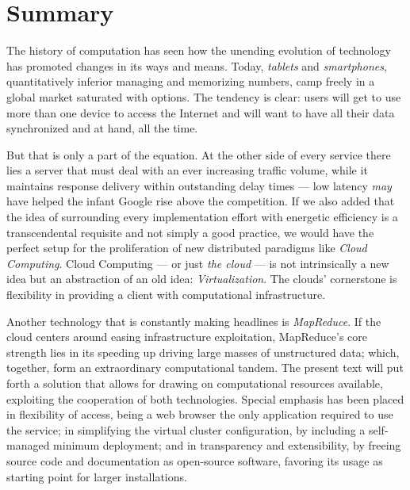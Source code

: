 \chapter*{Summary}
\noindent The history of computation has seen how the unending evolution of technology has promoted changes in its ways and means. Today, \textit{tablets} and \textit{smartphones}, quantitatively inferior managing and memorizing numbers, camp freely in a global market saturated with options. The tendency is clear: users will get to use more than one device to access the Internet and will want to have all their data synchronized and at hand, all the time.

But that is only a part of the equation. At the other side of every service there lies a server that must deal with an ever increasing traffic volume, while it maintains response delivery within outstanding delay times --- low latency \emph{may} have helped the infant Google rise above the competition. If we also added that the idea of surrounding every implementation effort with energetic efficiency is a transcendental requisite and not simply a good practice, we would have the perfect setup for the proliferation of new distributed paradigms like \emph{Cloud Computing}. Cloud Computing --- or just \emph{the cloud} --- is not intrinsically a new idea but an abstraction of an old idea: \emph{Virtualization}. The clouds' cornerstone is flexibility in providing a client with computational infrastructure.

Another technology that is constantly making headlines is \emph{MapReduce}. If the cloud centers around easing infrastructure exploitation, MapReduce's core strength lies in its speeding up driving large masses of unstructured data; which, together, form an extraordinary computational tandem. The present text will put forth a solution that allows for drawing on computational resources available, exploiting the cooperation of both technologies. Special emphasis has been placed in flexibility of access, being a web browser the only application required to use the service; in simplifying the virtual cluster configuration, by including a self-managed minimum deployment; and in transparency and extensibility, by freeing source code and documentation as open-source software, favoring its usage as starting point for larger installations.
